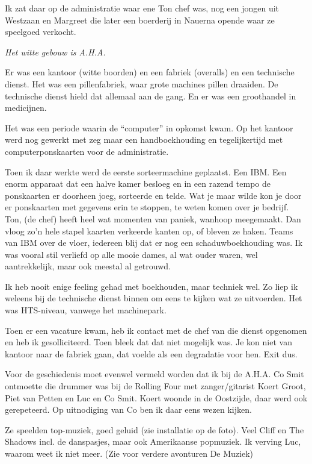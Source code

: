 \documentclass[10pt,twoside,openright]{memoir}
\begin{document}
Ik zat daar op de administratie waar ene Ton chef was, nog een jongen uit Westzaan en Margreet die later een boerderij in Nauerna opende waar ze speelgoed verkocht. 

\emph{Het witte gebouw is A.H.A.}

Er was een kantoor (witte boorden) en een fabriek (overalls) en een technische dienst. Het was een pillenfabriek, waar grote machines pillen draaiden. De technische dienst hield dat allemaal aan de gang. En er was een groothandel in medicijnen. 

Het was een periode waarin de “computer” in opkomst kwam. Op het kantoor werd nog gewerkt met zeg maar een handboekhouding en tegelijkertijd met computerponskaarten voor de administratie. 

Toen ik daar werkte werd de eerste sorteermachine geplaatst. Een IBM. Een enorm apparaat dat een halve kamer besloeg en in een razend tempo de ponskaarten er doorheen joeg, sorteerde en telde. Wat je maar wilde kon je door er ponskaarten met gegevens erin te stoppen, te weten komen over je bedrijf. Ton, (de chef) heeft heel wat momenten van paniek, wanhoop meegemaakt. Dan vloog zo’n hele stapel kaarten verkeerde kanten op, of bleven ze haken. Teams van IBM over de vloer, iedereen blij dat er nog een schaduwboekhouding was. Ik was vooral stil verliefd op alle mooie dames, al wat ouder waren, wel aantrekkelijk, maar ook meestal al getrouwd. 

Ik heb nooit enige feeling gehad met boekhouden, maar techniek wel. Zo liep ik weleens bij de technische dienst binnen om eens te kijken wat ze uitvoerden. Het was HTS-niveau, vanwege het machinepark. 

Toen er een vacature kwam, heb ik contact met de chef van die dienst opgenomen en heb ik gesolliciteerd. Toen bleek dat dat niet mogelijk was. Je kon niet van kantoor naar de fabriek gaan, dat voelde als een degradatie voor hen. Exit dus.

Voor de geschiedenis moet evenwel vermeld worden dat ik bij de A.H.A. Co Smit ontmoette die drummer was bij de Rolling Four met zanger/gitarist Koert Groot, Piet van Petten en Luc en Co Smit. Koert woonde in de Oostzijde, daar werd ook gerepeteerd. Op uitnodiging van Co ben ik daar eens wezen kijken. 

Ze speelden top-muziek, goed geluid (zie installatie op de foto). Veel Cliff en The Shadows incl. de danspasjes, maar ook Amerikaanse popmuziek. Ik verving Luc, waarom weet ik niet meer. (Zie voor verdere avonturen De Muziek)
\end{document}
